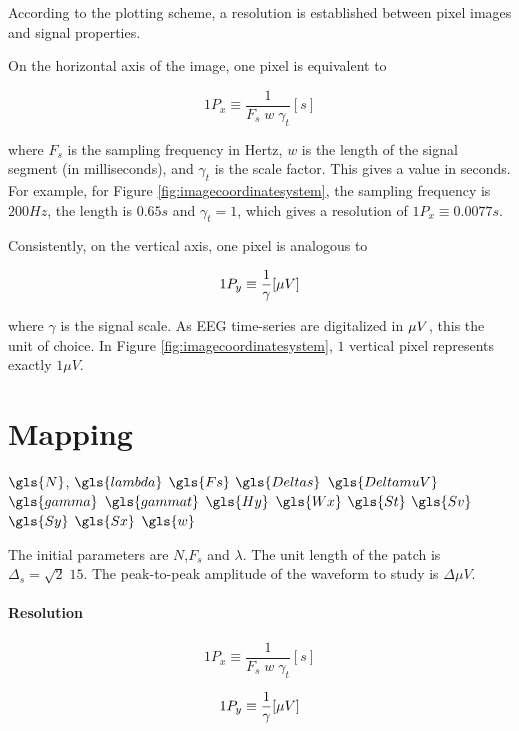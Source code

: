 According to the plotting scheme, a resolution is established between pixel images and signal properties.

On the horizontal axis of the image, one pixel is equivalent to 

\begin{equation}
1 P_x \equiv \frac{1}{F_s \; w \; \gamma_t}  [\si{s}]
\label{eq:resolutionx}
\end{equation}

\noindent where $F_s$ is the sampling frequency in Hertz, $w$ is the length of the signal segment (in milliseconds), and $\gamma_t$ is the scale factor.  This gives a value in seconds.  For example, for Figure \ref{fig:imagecoordinatesystem}, the sampling frequency is $200 Hz$, the length is $0.65 s$ and $\gamma_t = 1$, which gives a resolution of $1 P_x \equiv 0.0077 s$. 

Consistently, on the vertical axis, one pixel is analogous to 

\begin{equation}
1 P_y \equiv \frac{1}{\gamma}  [\si\mu{V}]
\label{eq:resolutiony}
\end{equation}

\noindent where $\gamma$ is the signal scale.  As EEG time-series are digitalized in $\si\mu{V}$, this the unit of choice.  In Figure \ref{fig:imagecoordinatesystem}, $1$ vertical pixel represents exactly $1 \mu V$.

\section{Mapping}

$\gls{N}$, 
$\gls{lambda}$
$\gls{Fs}$
$\gls{Deltas}$
$\gls{DeltamuV}$
$\gls{gamma}$
$\gls{gammat}$
$\gls{Hy}$
$\gls{Wx}$
$\gls{St}$
$\gls{Sv}$
$\gls{Sy}$
$\gls{Sx}$
$\gls{w}$

The initial parameters are $N$,$F_s$ and $\lambda$.  The unit length of the patch is $\Delta_s = \sqrt{2} \; 15$.  The peak-to-peak amplitude of the waveform to study is $ \Delta \mu V $.

\paragraph{Resolution}

\begin{equation}
1 P_x \equiv \frac{1}{F_s \; w \; \gamma_t}  [\si{s}]
\label{eq:resolutionx}
\end{equation}

\begin{equation}
1 P_y \equiv \frac{1}{\gamma}  [\si\mu{V}]
\label{eq:resolutiony}
\end{equation}

